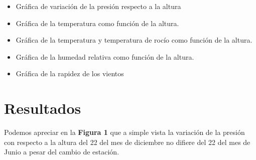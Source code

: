 \documentclass[a4paper]{article}
\begin{document}
\begin{itemize}
  \item Gráfica de variación de la presión respecto a la altura
  \item Gráfica de la temperatura como función de la altura.
  \item Gráfica de la temperatura y temperatura de rocío como función de la altura.
  \item Gráfica de la humedad relativa como función de la altura.  
  \item Gráfica de la rapidez de los vientos
  
\end{itemize}



\section{Resultados}

Podemos apreciar en la \textbf{Figura 1} que a simple vista la variación de la presión con respecto a la altura del 22 del mes de diciembre no difiere del 22 del mes de Junio a pesar del cambio de estación.
\end{document}
